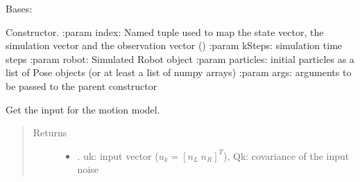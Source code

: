 \documentclass[letterpaper,10pt,english]{sphinxmanual}
\begin{document}
\begin{fulllineitems}
\label{\detokenize{particle_filter:PF_3DOF_DR.PF_3DOF_DR}}
\sphinxAtStartPar
Bases: {\hyperref[\detokenize{particle_filter:MCLocalization.MCLocalization}]{}}

\begin{fulllineitems}
\label{\detokenize{particle_filter:PF_3DOF_DR.PF_3DOF_DR.__init__}}
\sphinxAtStartPar
Constructor.
:param index: Named tuple used to map the state vector, the simulation vector and the observation vector ()
:param kSteps: simulation time steps
:param robot: Simulated Robot object
:param particles: initial particles as a list of Pose objects (or at least a list of numpy arrays)
:param args: arguments to be passed to the parent constructor

\end{fulllineitems}


\begin{fulllineitems}
\label{\detokenize{particle_filter:PF_3DOF_DR.PF_3DOF_DR.GetInput}}
\sphinxAtStartPar
Get the input for the motion model.
\begin{quote}\begin{description}
\item[{Returns}] \leavevmode
\sphinxAtStartPar
\begin{itemize}
\item {} 
\sphinxAtStartPar
{}. uk: input vector (\(u_k=[n_L~n_R]^T\)), Qk: covariance of the input noise

\end{itemize}


\end{description}\end{quote}


\end{fulllineitems}
\end{fulllineitems}
\end{document}
